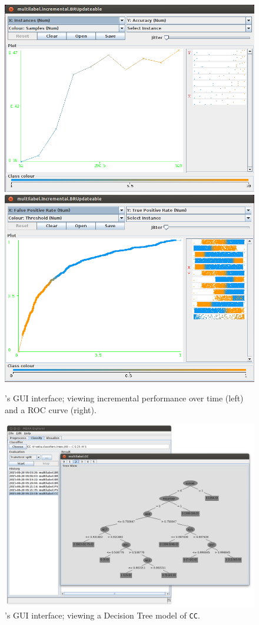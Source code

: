 \documentclass[11pt]{article}
\begin{document}

\begin{figure}
	\centering
	\includegraphics[height=0.30\textwidth]{GUI06.png}
	\includegraphics[height=0.30\textwidth]{GUI07.png}
	\caption{\label{screen:curves} 's GUI interface; viewing incremental performance over time (left) and a ROC curve (right).}
\end{figure}

\begin{figure}
	\centering
	\includegraphics[height=0.55\textwidth]{GUI05.png}
	\caption{\label{screen:graphs} 's GUI interface; viewing a Decision Tree model of \texttt{CC}.}
\end{figure}
\end{document}
